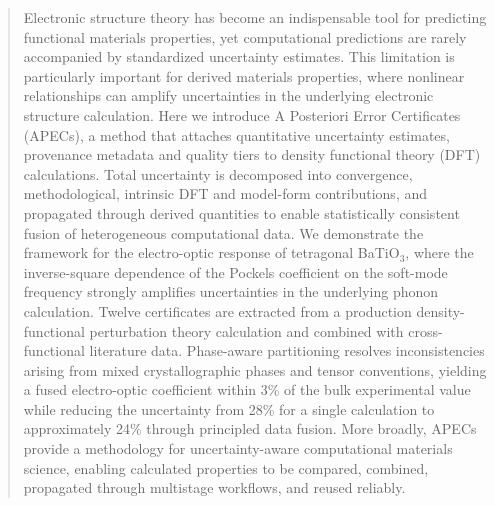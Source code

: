 \documentclass[twocolumn,superscriptaddress,amsmath,amssymb,longbibliography]{revtex4-2}
\begin{document}
\begin{abstract}
Electronic structure theory has become an indispensable tool for predicting functional materials properties, yet computational predictions are rarely accompanied by standardized uncertainty estimates. This limitation is particularly important for derived materials properties, where nonlinear relationships can amplify uncertainties in the underlying electronic structure calculation. Here we introduce A Posteriori Error Certificates (APECs), a method that attaches quantitative uncertainty estimates,  provenance metadata and quality tiers to density functional theory (DFT) calculations. Total uncertainty is decomposed into convergence, methodological, intrinsic DFT and model-form contributions, and propagated through derived quantities to enable statistically consistent fusion of heterogeneous computational data. We demonstrate the framework for the electro-optic response of tetragonal BaTiO$_3$, where the inverse-square dependence of the Pockels coefficient on the soft-mode frequency strongly amplifies uncertainties in the underlying phonon calculation.
Twelve certificates are extracted from a production density-functional perturbation theory
calculation and combined  with cross-functional literature data. Phase-aware
partitioning  resolves inconsistencies arising from mixed crystallographic phases and tensor conventions, yielding a fused electro-optic coefficient within 3\% of the bulk experimental value while reducing the uncertainty from 28\% for a single calculation to approximately 24\% through principled data fusion.
More broadly, APECs provide a methodology for uncertainty-aware computational materials science, enabling calculated properties to be compared, combined, propagated through multistage workflows, and reused reliably.
\end{abstract}
\end{document}
